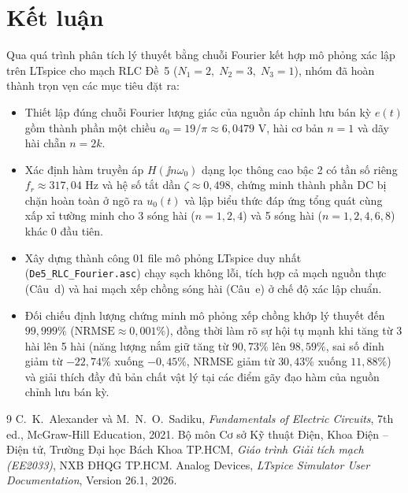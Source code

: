 \section{Kết luận}

Qua quá trình phân tích lý thuyết bằng chuỗi Fourier kết hợp mô phỏng xác lập trên LTspice cho mạch RLC Đề~5 ($N_1 = 2,\; N_2 = 3,\; N_3 = 1$), nhóm đã hoàn thành trọn vẹn các mục tiêu đặt ra:
\begin{itemize}
    \item Thiết lập đúng chuỗi Fourier lượng giác của nguồn áp chỉnh lưu bán kỳ $e(t)$ gồm thành phần một chiều $a_0 = 19/\pi \approx 6{,}0479\text{ V}$, hài cơ bản $n=1$ và dãy hài chẵn $n = 2k$.
    \item Xác định hàm truyền áp $H(\jj n\omega_0)$ dạng lọc thông cao bậc 2 có tần số riêng $f_r \approx 317{,}04\text{ Hz}$ và hệ số tắt dần $\zeta \approx 0{,}498$, chứng minh thành phần DC bị chặn hoàn toàn ở ngõ ra $u_0(t)$ và lập biểu thức đáp ứng tổng quát cùng xấp xỉ tường minh cho 3 sóng hài ($n=1,2,4$) và 5 sóng hài ($n=1,2,4,6,8$) khác $0$ đầu tiên.
    \item Xây dựng thành công 01 file mô phỏng LTspice duy nhất (\texttt{De5\_RLC\_Fourier.asc}) chạy sạch không lỗi, tích hợp cả mạch nguồn thực (Câu~d) và hai mạch xếp chồng sóng hài (Câu~e) ở chế độ xác lập chuẩn.
    \item Đối chiếu định lượng chứng minh mô phỏng xếp chồng khớp lý thuyết đến $99{,}999\%$ ($\text{NRMSE} \approx 0{,}001\%$), đồng thời làm rõ sự hội tụ mạnh khi tăng từ 3 hài lên 5 hài (năng lượng nắm giữ tăng từ $90{,}73\%$ lên $98{,}59\%$, sai số đỉnh giảm từ $-22{,}74\%$ xuống $-0{,}45\%$, NRMSE giảm từ $30{,}43\%$ xuống $11{,}88\%$) và giải thích đầy đủ bản chất vật lý tại các điểm gãy đạo hàm của nguồn chỉnh lưu bán kỳ.
\end{itemize}

\begin{thebibliography}{9}
    C.~K.~Alexander và M.~N.~O.~Sadiku, \textit{Fundamentals of Electric Circuits}, 7th ed., McGraw-Hill Education, 2021.
    Bộ môn Cơ sở Kỹ thuật Điện, Khoa Điện -- Điện tử, Trường Đại học Bách Khoa TP.HCM, \textit{Giáo trình Giải tích mạch (EE2033)}, NXB ĐHQG TP.HCM.
    Analog Devices, \textit{LTspice Simulator User Documentation}, Version 26.1, 2026.
\end{thebibliography}

